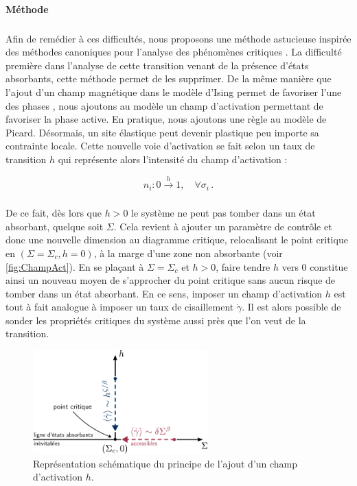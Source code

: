 \paragraph{Méthode}

\label{sec:methodeFSS}

\subparagraph{}Afin de remédier à ces difficultés, nous proposons une méthode astucieuse inspirée des méthodes canoniques pour l'analyse des phénomènes critiques \cite{lubeck_universal_2004}. La difficulté première dans l'analyse de cette transition venant de la présence d'états absorbants, cette méthode permet de les supprimer. De la même manière que l'ajout d'un champ magnétique dans le modèle d'Ising permet de favoriser l'une des phases \cite{kardar_statistical_2007}, nous ajoutons au modèle un champ d'activation permettant de favoriser la phase active. En pratique, nous ajoutons une règle au modèle de Picard. Désormais, un site élastique peut devenir plastique peu importe sa contrainte locale. Cette nouvelle voie d'activation se fait selon un taux de transition $h$ qui représente alors l'intensité du champ d'activation :

\begin{equation}
n_i: 0\xrightarrow{h}1,\quad \forall \sigma_i \, .
\end{equation}

\subparagraph{}De ce fait, dès lors que $h>0$ le système ne peut pas tomber dans un état absorbant, quelque soit $\Sigma$. Cela revient à ajouter un paramètre de contrôle et donc une nouvelle dimension au diagramme critique, relocalisant le point critique en $(\Sigma = \Sigma_c, h=0)$, à la marge d'une zone non absorbante (voir \autoref{fig:ChampAct}). En se plaçant à $\Sigma = \Sigma_c$ et $h>0$, faire tendre $h$ vers $0$ constitue ainsi un nouveau moyen de s'approcher du point critique sans aucun risque de tomber dans un état absorbant. En ce sens, imposer un champ d'activation $h$ est tout à fait analogue à imposer un taux de cisaillement $\dot{\gamma}$. Il est alors possible de sonder les propriétés critiques du système aussi près que l'on veut de la transition.

\begin{figure}
	\centering
	\includegraphics[width=0.6\textwidth]{Chapitre4/Figures/CasPhysique/ApprocheFSS.pdf}
	\caption{Représentation schématique du principe de l'ajout d'un champ d'activation $h$.}
	\label{fig:ChampAct}
\end{figure}

